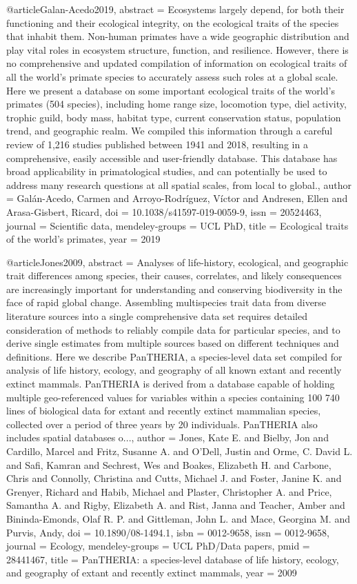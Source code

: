 {{{{@article{Galan-Acedo2019,
abstract = {Ecosystems largely depend, for both their functioning and their ecological integrity, on the ecological traits of the species that inhabit them. Non-human primates have a wide geographic distribution and play vital roles in ecosystem structure, function, and resilience. However, there is no comprehensive and updated compilation of information on ecological traits of all the world's primate species to accurately assess such roles at a global scale. Here we present a database on some important ecological traits of the world's primates (504 species), including home range size, locomotion type, diel activity, trophic guild, body mass, habitat type, current conservation status, population trend, and geographic realm. We compiled this information through a careful review of 1,216 studies published between 1941 and 2018, resulting in a comprehensive, easily accessible and user-friendly database. This database has broad applicability in primatological studies, and can potentially be used to address many research questions at all spatial scales, from local to global.},
author = {Gal{\'{a}}n-Acedo, Carmen and Arroyo-Rodr{\'{i}}guez, V{\'{i}}ctor and Andresen, Ellen and Arasa-Gisbert, Ricard},
doi = {10.1038/s41597-019-0059-9},
issn = {20524463},
journal = {Scientific data},
mendeley-groups = {UCL PhD},
title = {{Ecological traits of the world's primates}},
year = {2019}
}

@article{Jones2009,
abstract = {Analyses of life-history, ecological, and geographic trait differences among species, their causes, correlates, and likely consequences are increasingly important for understanding and conserving biodiversity in the face of rapid global change. Assembling multispecies trait data from diverse literature sources into a single comprehensive data set requires detailed consideration of methods to reliably compile data for particular species, and to derive single estimates from multiple sources based on different techniques and definitions. Here we describe PanTHERIA, a species-level data set compiled for analysis of life history, ecology, and geography of all known extant and recently extinct mammals. PanTHERIA is derived from a database capable of holding multiple geo-referenced values for variables within a species containing 100 740 lines of biological data for extant and recently extinct mammalian species, collected over a period of three years by 20 individuals. PanTHERIA also includes spatial databases o...},
author = {Jones, Kate E. and Bielby, Jon and Cardillo, Marcel and Fritz, Susanne A. and O'Dell, Justin and Orme, C. David L. and Safi, Kamran and Sechrest, Wes and Boakes, Elizabeth H. and Carbone, Chris and Connolly, Christina and Cutts, Michael J. and Foster, Janine K. and Grenyer, Richard and Habib, Michael and Plaster, Christopher A. and Price, Samantha A. and Rigby, Elizabeth A. and Rist, Janna and Teacher, Amber and Bininda-Emonds, Olaf R. P. and Gittleman, John L. and Mace, Georgina M. and Purvis, Andy},
doi = {10.1890/08-1494.1},
isbn = {0012-9658},
issn = {0012-9658},
journal = {Ecology},
mendeley-groups = {UCL PhD/Data papers},
pmid = {28441467},
title = {{PanTHERIA: a species-level database of life history, ecology, and geography of extant and recently extinct mammals}},
year = {2009}
}

}}}}
